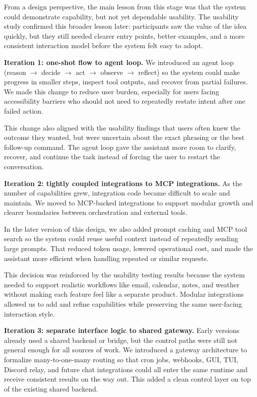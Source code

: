 \documentclass{article}
\begin{document}
From a design perspective, the main lesson from this stage was that the system
could demonstrate capability, but not yet dependable usability. The usability
study confirmed this broader lesson later: participants saw the value of the idea
quickly, but they still needed clearer entry points, better examples, and a more
consistent interaction model before the system felt easy to adopt.

\medskip
\noindent\textbf{Iteration 1: one-shot flow to agent loop.} We introduced an agent loop
(reason $\rightarrow$ decide $\rightarrow$ act $\rightarrow$ observe
$\rightarrow$ reflect) so the system could make progress in smaller steps,
inspect tool outputs, and recover from partial failures. We made this change to
reduce user burden, especially for users facing accessibility barriers who should
not need to repeatedly restate intent after one failed action.

This change also aligned with the usability findings that users often knew the
outcome they wanted, but were uncertain about the exact phrasing or the best
follow-up command. The agent loop gave the assistant more room to clarify,
recover, and continue the task instead of forcing the user to restart the
conversation.

\medskip
\noindent\textbf{Iteration 2: tightly coupled integrations to MCP integrations.} As the
number of capabilities grew, integration code became difficult to scale and
maintain. We moved to MCP-backed integrations to support modular growth and
clearer boundaries between orchestration and external tools.

In the later version of this design, we also added prompt caching and MCP tool
search so the system could reuse useful context instead of repeatedly sending
large prompts. That reduced token usage, lowered operational cost, and made the
assistant more efficient when handling repeated or similar requests.

This decision was reinforced by the usability testing results because the system
needed to support realistic workflows like email, calendar, notes, and weather
without making each feature feel like a separate product. Modular integrations
allowed us to add and refine capabilities while preserving the same user-facing
interaction style.

\medskip
\noindent\textbf{Iteration 3: separate interface logic to shared gateway.} Early versions
already used a shared backend or bridge, but the control paths were still not
general enough for all sources of work. We introduced a gateway architecture to
formalize many-to-one-many routing so that cron jobs, webhooks, GUI, TUI,
Discord relay, and future chat integrations could all enter the same runtime and
receive consistent results on the way out. This added a clean control layer on
top of the existing shared backend.
\end{document}
